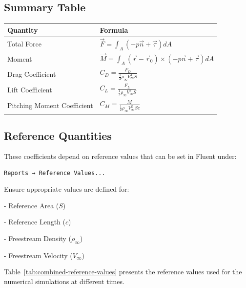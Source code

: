 \documentclass[12pt]{article}
\begin{document}
\subsection{Summary Table}
\begin{center}
\begin{tabular}{ll}
\hline
\textbf{Quantity} & \textbf{Formula} \\
\hline
Total Force & $ \vec{F} = \int_A (-p \vec{n} + \vec{\tau}) dA $ \\
Moment & $ \vec{M} = \int_A (\vec{r} - \vec{r}_0) \times (-p \vec{n} + \vec{\tau}) dA $ \\
Drag Coefficient & $ C_D = \frac{F_D}{\frac{1}{2} \rho_\infty V_\infty^2 S} $ \\
Lift Coefficient & $ C_L = \frac{F_L}{\frac{1}{2} \rho_\infty V_\infty^2 S} $ \\
Pitching Moment Coefficient & $ C_M = \frac{M}{\frac{1}{2} \rho_\infty V_\infty^2 S c} $ \\
\hline
\end{tabular}
\end{center}

\subsection{Reference Quantities}
These coefficients depend on reference values that can be set in Fluent under:

\begin{center}
    \texttt{Reports → Reference Values...}
\end{center}

Ensure appropriate values are defined for:
    
- Reference Area ($S$)
    
- Reference Length ($c$)
    
- Freestream Density ($\rho_\infty$)
    
- Freestream Velocity ($V_\infty$)

Table~\ref{tab:combined-reference-values} presents the reference values used for the numerical simulations at different times. %
%
\end{document}
